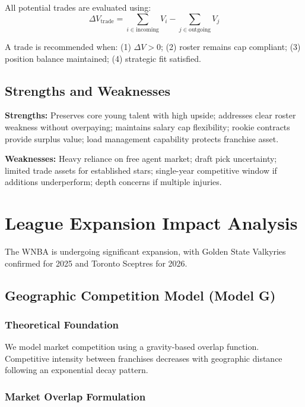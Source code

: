 \documentclass{mcmthesis}
\begin{document}
All potential trades are evaluated using:
\begin{equation}
\Delta V_{\text{trade}} = \sum_{i \in \text{incoming}} V_i - \sum_{j \in \text{outgoing}} V_j
\end{equation}

A trade is recommended when: (1) $\Delta V > 0$; (2) roster remains cap compliant; (3) position balance maintained; (4) strategic fit satisfied.

\subsection{Strengths and Weaknesses}

\textbf{Strengths:} Preserves core young talent with high upside; addresses clear roster weakness without overpaying; maintains salary cap flexibility; rookie contracts provide surplus value; load management capability protects franchise asset.

\textbf{Weaknesses:} Heavy reliance on free agent market; draft pick uncertainty; limited trade assets for established stars; single-year competitive window if additions underperform; depth concerns if multiple injuries.

\section{League Expansion Impact Analysis}

The WNBA is undergoing significant expansion, with Golden State Valkyries confirmed for 2025 and Toronto Sceptres for 2026.

\subsection{Geographic Competition Model (Model G)}

\subsubsection{Theoretical Foundation}

We model market competition using a gravity-based overlap function. Competitive intensity between franchises decreases with geographic distance following an exponential decay pattern.

\subsubsection{Market Overlap Formulation}
\end{document}
